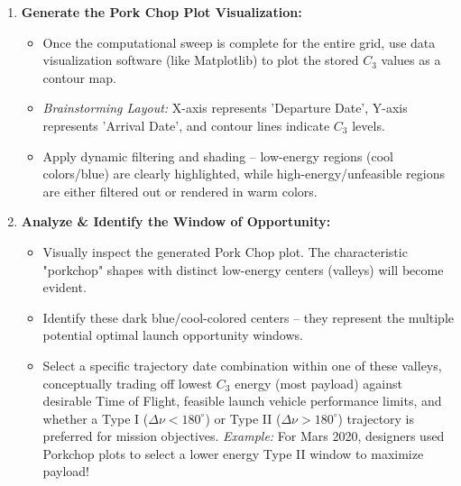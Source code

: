 \documentclass[12pt]{article}
\begin{document}
\begin{enumerate}
    \item \textbf{Generate the Pork Chop Plot Visualization:}
    \begin{itemize}
        \item Once the computational sweep is complete for the entire grid, use data visualization software (like Matplotlib) to plot the stored $C_3$ values as a contour map.
        \item \textit{Brainstorming Layout:} X-axis represents 'Departure Date', Y-axis represents 'Arrival Date', and contour lines indicate $C_3$ levels.
        \item Apply dynamic filtering and shading – low-energy regions (cool colors/blue) are clearly highlighted, while high-energy/unfeasible regions are either filtered out or rendered in warm colors.
    \end{itemize}

    \item \textbf{Analyze \& Identify the Window of Opportunity:}
    \begin{itemize}
        \item Visually inspect the generated Pork Chop plot. The characteristic "porkchop" shapes with distinct low-energy centers (valleys) will become evident.
        \item Identify these dark blue/cool-colored centers – they represent the multiple potential optimal launch opportunity windows.
        \item Select a specific trajectory date combination within one of these valleys, conceptually trading off lowest $C_3$ energy (most payload) against desirable Time of Flight, feasible launch vehicle performance limits, and whether a Type I ($\Delta \nu < 180^\circ$) or Type II ($\Delta \nu > 180^\circ$) trajectory is preferred for mission objectives. \textit{Example:} For Mars 2020, designers used Porkchop plots to select a lower energy Type II window to maximize payload!
    \end{itemize}
\end{enumerate}
\end{document}
